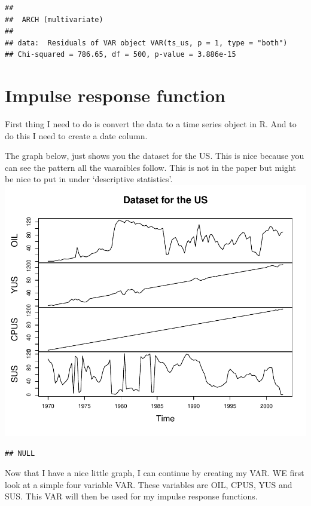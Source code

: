 \documentclass[11pt,preprint, authoryear]{elsarticle}
\numberwithin{equation}{section}
\numberwithin{figure}{section}
\numberwithin{table}{section}
\begin{document}
\begin{verbatim}
## 
##  ARCH (multivariate)
## 
## data:  Residuals of VAR object VAR(ts_us, p = 1, type = "both")
## Chi-squared = 786.65, df = 500, p-value = 3.886e-15
\end{verbatim}

\hypertarget{impulse-response-function}{%
\section{Impulse response function}\label{impulse-response-function}}

First thing I need to do is convert the data to a time series object in
R. And to do this I need to create a date column.

The graph below, just shows you the dataset for the US. This is nice
because you can see the pattern all the vaaraibles follow. This is not
in the paper but might be nice to put in under `descriptive statistics'.
\includegraphics{replication_files/figure-latex/unnamed-chunk-6-1.pdf}

\begin{verbatim}
## NULL
\end{verbatim}

Now that I have a nice little graph, I can continue by creating my VAR.
WE first look at a simple four variable VAR. These variables are OIL,
CPUS, YUS and SUS. This VAR will then be used for my impulse response
functions.
\end{document}
